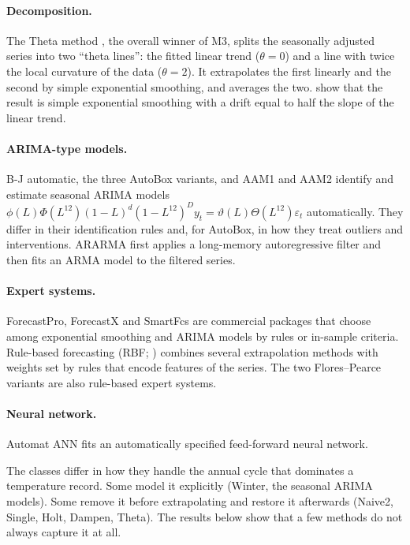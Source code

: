 \paragraph{Decomposition.} The Theta method \citep{assimakopoulos2000theta}, the overall
winner of M3, splits the seasonally adjusted series into two ``theta lines'': the
fitted linear trend ($\theta=0$) and a line with twice the local curvature of the data
($\theta=2$). It extrapolates the first linearly and the second by simple exponential
smoothing, and averages the two. \citet{hyndmanbillah2003} show that the result is
simple exponential smoothing with a drift equal to half the slope of the linear trend.

\paragraph{ARIMA-type models.} B-J automatic, the three AutoBox variants, and AAM1 and
AAM2 identify and estimate seasonal ARIMA models
$\phi(L)\Phi(L^{12})(1-L)^d(1-L^{12})^D y_t=\vartheta(L)\Theta(L^{12})\varepsilon_t$
automatically. They differ in their identification rules and, for AutoBox, in how they
treat outliers and interventions. ARARMA first applies a long-memory autoregressive
filter and then fits an ARMA model to the filtered series.

\paragraph{Expert systems.} ForecastPro, ForecastX and SmartFcs are commercial packages
that choose among exponential smoothing and ARIMA models by rules or in-sample criteria.
Rule-based forecasting (RBF; \citealp{collopyarmstrong1992}) combines several
extrapolation methods with weights set by rules that encode features of the series. The
two Flores--Pearce variants are also rule-based expert systems.

\paragraph{Neural network.} Automat ANN fits an automatically specified feed-forward
neural network.

The classes differ in how they handle the annual cycle that dominates a temperature
record. Some model it explicitly (Winter, the seasonal ARIMA models). Some remove it
before extrapolating and restore it afterwards (Naive2, Single, Holt, Dampen, Theta).
The results below show that a few methods do not always capture it at all.

